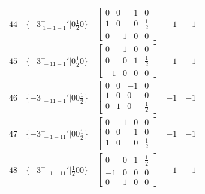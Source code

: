 \documentclass[fleqn,8pt]{jsarticle}
\begin{document}
\begin{longtable}{ccccc}
$ 44 $ & $ \{-3^{+}_{\,\,1-1-1}{}'|0 \frac{1}{2} 0\} $ & $ \begin{bmatrix} 0 & 0 & 1 & 0 \\ 1 & 0 & 0 & \frac{1}{2} \\ 0 & -1 & 0 & 0 \end{bmatrix} $ & $ -1 $ & $ -1 $ \\ \hline
$ 45 $ & $ \{-3^{-}_{\,\,-11-1}{}'|0 \frac{1}{2} 0\} $ & $ \begin{bmatrix} 0 & 1 & 0 & 0 \\ 0 & 0 & 1 & \frac{1}{2} \\ -1 & 0 & 0 & 0 \end{bmatrix} $ & $ -1 $ & $ -1 $ \\ \hline
$ 46 $ & $ \{-3^{+}_{\,\,-11-1}{}'|0 0 \frac{1}{2}\} $ & $ \begin{bmatrix} 0 & 0 & -1 & 0 \\ 1 & 0 & 0 & 0 \\ 0 & 1 & 0 & \frac{1}{2} \end{bmatrix} $ & $ -1 $ & $ -1 $ \\ \hline
$ 47 $ & $ \{-3^{-}_{\,\,-1-11}{}'|0 0 \frac{1}{2}\} $ & $ \begin{bmatrix} 0 & -1 & 0 & 0 \\ 0 & 0 & 1 & 0 \\ 1 & 0 & 0 & \frac{1}{2} \end{bmatrix} $ & $ -1 $ & $ -1 $ \\ \hline
$ 48 $ & $ \{-3^{+}_{\,\,-1-11}{}'|\frac{1}{2} 0 0\} $ & $ \begin{bmatrix} 0 & 0 & 1 & \frac{1}{2} \\ -1 & 0 & 0 & 0 \\ 0 & 1 & 0 & 0 \end{bmatrix} $ & $ -1 $ & $ -1 $ \\
\end{longtable}
\end{document}
